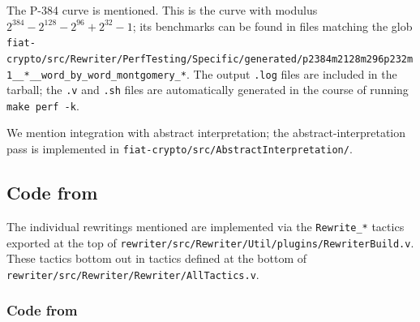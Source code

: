 \begin{subappendices}
The P-384 curve is mentioned.
This is the curve with modulus $2^{384} - 2^{128} - 2^{96} + 2^{32} - 1$; its benchmarks can be found in files matching the glob \texttt{fiat-crypto/src/Rewriter/PerfTesting/Specific/generated/p2384m2128m296p232m1\_\_*\_\_word\_by\_word\_montgomery\_*}.
The output \texttt{.log} files are included in the tarball; the \texttt{.v} and \texttt{.sh} files are automatically generated in the course of running \texttt{make perf -k}.

We mention integration with abstract interpretation; the abstract-interpretation pass is implemented in \texttt{fiat-crypto/src/AbstractInterpretation/}.

\subsection{Code from }

The individual rewritings mentioned are implemented via the \texttt{Rewrite\_*} tactics exported at the top of \texttt{rewriter/src/Rewriter/Util/plugins/RewriterBuild.v}.
These tactics bottom out in tactics defined at the bottom of \texttt{rewriter/src/Rewriter/Rewriter/AllTactics.v}.

\subsubsection{Code from }\label{sec:code:nine-steps}


\end{subappendices}
